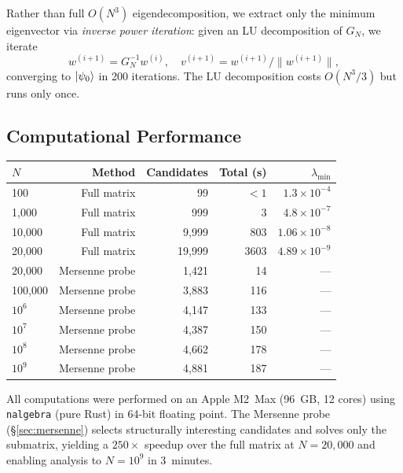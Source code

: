\documentclass[11pt,a4paper]{article}
\begin{document}
Rather than full $O(N^3)$ eigendecomposition, we extract only the
minimum eigenvector via \emph{inverse power iteration}: given an
LU decomposition of $G_N$, we iterate
\begin{equation}
  w^{(i+1)} = G_N^{-1} w^{(i)}, \quad
  v^{(i+1)} = w^{(i+1)} / \|w^{(i+1)}\|,
\end{equation}
converging to $| \psi_0 \rangle$ in 200 iterations.
The LU decomposition costs $O(N^3/3)$ but runs only once.

\subsection{Computational Performance}

\begin{center}
\begin{tabular}{@{}lrrrr@{}}
\toprule
$N$ & Method & Candidates & Total (s) & $\lambda_{\min}$ \\
\midrule
100   & Full matrix & 99       & $< 1$    & $1.3 \times 10^{-4}$ \\
1{,}000  & Full matrix & 999      & 3        & $4.8 \times 10^{-7}$ \\
10{,}000 & Full matrix & 9{,}999  & 803      & $1.06 \times 10^{-8}$ \\
20{,}000 & Full matrix & 19{,}999 & 3603     & $4.89 \times 10^{-9}$ \\
\midrule
20{,}000  & Mersenne probe & 1{,}421  & 14    & --- \\
100{,}000 & Mersenne probe & 3{,}883  & 116   & --- \\
$10^6$    & Mersenne probe & 4{,}147  & 133   & --- \\
$10^7$    & Mersenne probe & 4{,}387  & 150   & --- \\
$10^8$    & Mersenne probe & 4{,}662  & 178   & --- \\
$10^9$    & Mersenne probe & 4{,}881  & 187   & --- \\
\bottomrule
\end{tabular}
\end{center}
All computations were performed on an Apple M2~Max (96~GB, 12 cores)
using \texttt{nalgebra} (pure Rust) in 64-bit floating point.
The Mersenne probe (\S\ref{sec:mersenne}) selects structurally interesting
candidates and solves only the submatrix, yielding a
$250\times$ speedup over the full matrix at $N = 20{,}000$
and enabling analysis to $N = 10^9$ in 3~minutes.

\end{document}
